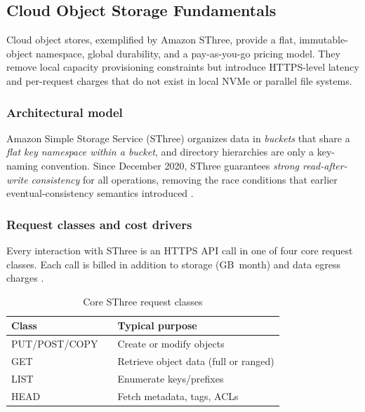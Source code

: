\documentclass[nomenclature, english, bibtex]{kththesis}
\numberwithin{listing}{chapter}
\begin{document}
\subsection{Cloud Object Storage Fundamentals}
\label{sec:cloud-object-storage-fundamentals}
Cloud object stores, exemplified by Amazon \gls{SThree}, provide a flat, immutable-object namespace, global durability, and a pay-as-you-go pricing model. They remove local capacity provisioning constraints but introduce \gls{HTTP}S-level latency and per-request charges that do not exist in local \gls{NVMe} or parallel file systems.

\subsubsection{Architectural model}
Amazon Simple Storage Service (\gls{SThree}) organizes data in \emph{buckets} that share a \emph{flat key namespace within a bucket}, and directory hierarchies are only a key-naming convention. Since December 2020, \gls{SThree} guarantees \emph{strong read-after-write consistency} for all operations, removing the race conditions that earlier eventual-consistency semantics introduced \cite{AWSConsistency2020}.

\subsubsection{Request classes and cost drivers}
Every interaction with \gls{SThree} is an \gls{HTTP}S \gls{API} call in one of four core request classes. Each call is billed in addition to storage (\si{GB}\, month) and data egress charges \cite{AWSS3Pricing2025}.

\begin{table}[ht]
  \centering
  \begin{tabular}{@{}p{3cm}p{2cm}p{6cm}@{}}
    \toprule
    \textbf{Class}    & & \textbf{Typical purpose} \\
    \midrule
    PUT/POST/COPY     & & Create or modify objects \\
    GET               & & Retrieve object data (full or ranged) \\
    LIST              & & Enumerate keys/prefixes \\
    HEAD              & & Fetch metadata, tags, ACLs \\
    \bottomrule
  \end{tabular}
  \caption{Core \gls{SThree} request classes}
  \label{tab:s3-requests}
\end{table}
\end{document}
